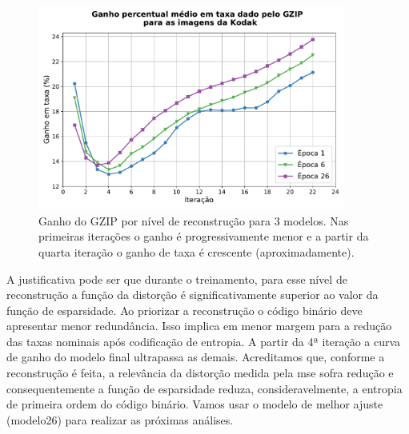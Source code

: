 \begin{figure}
	\centering
	\includegraphics[width=0.9\textwidth]{figuras/ganho_taxa_3epocas.pdf}
	\caption[Ganho do GZIP por nível de reconstrução]{Ganho do GZIP por nível de reconstrução para 3 modelos. Nas primeiras iterações o ganho é progressivamente menor e a partir da quarta iteração o ganho de taxa é crescente (aproximadamente).}  	
	\label{fig:gain_medio_bpp}
\end{figure}


A justificativa pode ser que durante o treinamento, para esse nível de reconstrução a função da distorção é significativamente superior ao valor da função de esparsidade. Ao priorizar a reconstrução o código binário deve apresentar menor redundância. Isso implica em menor margem para a redução das taxas nominais após codificação de entropia. 
A partir da 4ª iteração a curva de ganho do modelo final ultrapassa as demais. Acreditamos que, conforme a reconstrução é feita, a relevância da distorção medida pela \acrshort{mse} sofra redução e consequentemente a função de esparsidade reduza, consideravelmente, a entropia de primeira ordem do código binário. Vamos usar o modelo de melhor ajuste (modelo26) para realizar as próximas análises.  

